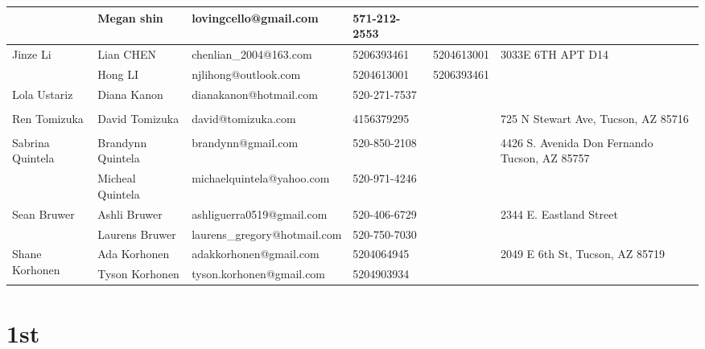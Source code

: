 \documentclass[landscape]{article}\usepackage[]{graphicx}\usepackage[]{color}
\begin{document}
\begin{longtable}{|p{100pt}|p{100pt}|p{140pt}|p{60pt}|p{64pt}|p{120pt}|}
 & Megan shin & lovingcello@gmail.com & 571-212-2553 &  & \\
\hline
\multirow{2}{100pt}{Jinze Li} & Lian CHEN & chenlian\_2004@163.com & 5206393461 & 5204613001 & \multirow{2}{120pt}{3033E 6TH APT D14} \\
 & Hong LI & njlihong@outlook.com & 5204613001 & 5206393461 & \\
\hline
\multirow{2}{100pt}{Lola Ustariz} & Diana Kanon & dianakanon@hotmail.com & 520-271-7537 &  & \multirow{2}{120pt}{} \\
 &  &  &  &  & \\
\hline
\multirow{2}{100pt}{Ren Tomizuka} & David Tomizuka & david@tomizuka.com & 4156379295 &  & \multirow{2}{120pt}{725 N Stewart Ave, Tucson, AZ 85716} \\
 &  &  &  &  & \\
\hline
\multirow{2}{100pt}{Sabrina Quintela} & Brandynn Quintela & brandynn@gmail.com & 520-850-2108 &  & \multirow{2}{120pt}{4426 S. Avenida Don Fernando Tucson, AZ 85757} \\
 & Micheal Quintela & michaelquintela@yahoo.com & 520-971-4246 &  & \\
\hline
\multirow{2}{100pt}{Sean Bruwer} & Ashli Bruwer & ashliguerra0519@gmail.com & 520-406-6729 &  & \multirow{2}{120pt}{2344 E. Eastland Street} \\
 & Laurens Bruwer & laurens\_gregory@hotmail.com & 520-750-7030 &  & \\
\hline
\multirow{2}{100pt}{Shane Korhonen} & Ada Korhonen & adakkorhonen@gmail.com & 5204064945 &  & \multirow{2}{120pt}{2049 E 6th St, Tucson, AZ 85719} \\
 & Tyson Korhonen & tyson.korhonen@gmail.com & 5204903934 &  & \\
\hline
\end{longtable}
\newpage
\section{1st}
\end{document}
